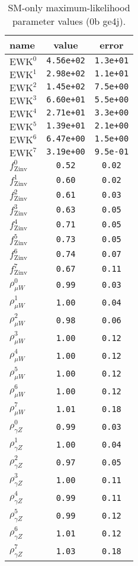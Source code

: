 \documentclass{article}
\begin{document}
\begin{table}\centering
\caption{SM-only maximum-likelihood parameter values (0b ge4j).}
\label{tab:mlParameterValues0b_ge4j}
\begin{tabular}{lcc}name & value & error \\ \hline
$\mathrm{EWK}^{0}$ & {\tt  4.56e+02} & {\tt  1.3e+01}\\
$\mathrm{EWK}^{1}$ & {\tt  2.98e+02} & {\tt  1.1e+01}\\
$\mathrm{EWK}^{2}$ & {\tt  1.45e+02} & {\tt  7.5e+00}\\
$\mathrm{EWK}^{3}$ & {\tt  6.60e+01} & {\tt  5.5e+00}\\
$\mathrm{EWK}^{4}$ & {\tt  2.71e+01} & {\tt  3.3e+00}\\
$\mathrm{EWK}^{5}$ & {\tt  1.39e+01} & {\tt  2.1e+00}\\
$\mathrm{EWK}^{6}$ & {\tt  6.47e+00} & {\tt  1.5e+00}\\
$\mathrm{EWK}^{7}$ & {\tt  3.19e+00} & {\tt  9.5e-01}\\
$f_\mathrm{Zinv}^{0}$ & {\tt 0.52} & {\tt 0.02}\\
$f_\mathrm{Zinv}^{1}$ & {\tt 0.60} & {\tt 0.02}\\
$f_\mathrm{Zinv}^{2}$ & {\tt 0.61} & {\tt 0.03}\\
$f_\mathrm{Zinv}^{3}$ & {\tt 0.63} & {\tt 0.05}\\
$f_\mathrm{Zinv}^{4}$ & {\tt 0.71} & {\tt 0.05}\\
$f_\mathrm{Zinv}^{5}$ & {\tt 0.73} & {\tt 0.05}\\
$f_\mathrm{Zinv}^{6}$ & {\tt 0.74} & {\tt 0.07}\\
$f_\mathrm{Zinv}^{7}$ & {\tt 0.67} & {\tt 0.11}\\
$\rho_{\mu W}^{0}$ & {\tt 0.99} & {\tt 0.03}\\
$\rho_{\mu W}^{1}$ & {\tt 1.00} & {\tt 0.04}\\
$\rho_{\mu W}^{2}$ & {\tt 0.98} & {\tt 0.06}\\
$\rho_{\mu W}^{3}$ & {\tt 1.00} & {\tt 0.12}\\
$\rho_{\mu W}^{4}$ & {\tt 1.00} & {\tt 0.12}\\
$\rho_{\mu W}^{5}$ & {\tt 1.00} & {\tt 0.12}\\
$\rho_{\mu W}^{6}$ & {\tt 1.00} & {\tt 0.12}\\
$\rho_{\mu W}^{7}$ & {\tt 1.01} & {\tt 0.18}\\
$\rho_{\gamma Z}^{0}$ & {\tt 0.99} & {\tt 0.03}\\
$\rho_{\gamma Z}^{1}$ & {\tt 1.00} & {\tt 0.04}\\
$\rho_{\gamma Z}^{2}$ & {\tt 0.97} & {\tt 0.05}\\
$\rho_{\gamma Z}^{3}$ & {\tt 1.00} & {\tt 0.11}\\
$\rho_{\gamma Z}^{4}$ & {\tt 0.99} & {\tt 0.11}\\
$\rho_{\gamma Z}^{5}$ & {\tt 0.99} & {\tt 0.12}\\
$\rho_{\gamma Z}^{6}$ & {\tt 1.01} & {\tt 0.12}\\
$\rho_{\gamma Z}^{7}$ & {\tt 1.03} & {\tt 0.18}\\
\hline
\end{tabular}
\end{table}
\end{document}
